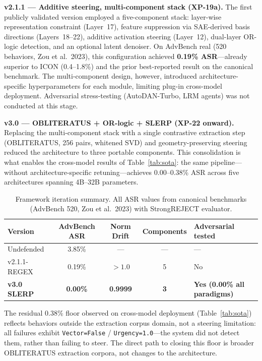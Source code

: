 \documentclass{article}
\begin{document}
\textbf{v2.1.1 --- Additive steering, multi-component stack (XP-19a).}
The first publicly validated version employed a five-component stack:
layer-wise representation constraint (Layer~17), feature suppression via SAE-derived
basis directions (Layers~18--22), additive activation steering (Layer~12),
dual-layer OR-logic detection, and an optional latent denoiser.
On AdvBench real (520 behaviors, Zou et al.\ 2023), this configuration achieved
\textbf{0.19\% ASR}---already superior to ICON (0.4--1.8\%) and the prior
best-reported result on the canonical benchmark.
The multi-component design, however, introduced architecture-specific
hyperparameters for each module, limiting plug-in cross-model deployment.
Adversarial stress-testing (AutoDAN-Turbo, LRM agents) was not conducted at
this stage.

\textbf{v3.0 --- \textsc{OBLITERATUS} + OR-logic + SLERP (XP-22 onward).}
Replacing the multi-component stack with a single contrastive extraction step
(\textsc{OBLITERATUS}, 256 pairs, whitened SVD) and geometry-preserving steering
reduced the architecture to three portable components.
This consolidation is what enables the cross-model results of
Table~\ref{tab:sota}: the same pipeline---without architecture-specific
retuning---achieves 0.00--0.38\% ASR across five architectures spanning 4B--32B
parameters.

\begin{table}[h]
\centering
\caption{Framework iteration summary. All ASR values from canonical benchmarks
  (AdvBench 520, Zou et al.\ 2023) with StrongREJECT evaluator.}
\label{tab:evolution}
\small
\begin{tabular}{lcccl}
\toprule
\textbf{Version} & \textbf{AdvBench ASR} & \textbf{Norm Drift} & \textbf{Components} & \textbf{Adversarial tested} \\
\midrule
Undefended          & 3.85\%   & ---    & ---  & --- \\
v2.1.1-REGEX        & 0.19\%   & $>1.0$ & 5    & No \\
\textbf{v3.0 SLERP} & \textbf{0.00\%} & \textbf{0.9999} & \textbf{3} & \textbf{Yes (0.00\% all paradigms)} \\
\bottomrule
\end{tabular}
\end{table}

The residual 0.38\% floor observed on cross-model deployment (Table~\ref{tab:sota})
reflects behaviors outside the extraction corpus domain, not a steering limitation:
all failures exhibit \texttt{Vector=False} / \texttt{Urgency=1.0}---the system
did not detect them, rather than failing to steer.
The direct path to closing this floor is broader \textsc{OBLITERATUS} extraction
corpora, not changes to the architecture.
\end{document}
